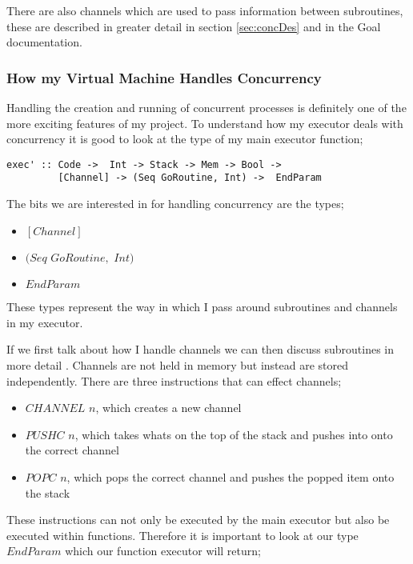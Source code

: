 There are also channels which are used to pass information between subroutines, these are described in greater detail in section \ref{sec:concDes} and in the Goal documentation.   

\subsubsection{How my Virtual Machine Handles Concurrency}

Handling the creation and running of concurrent processes is definitely one of the more exciting features of my project. To understand how my executor deals with concurrency it is good to look at the type of my main executor function;

\begin{lstlisting}
exec' :: Code ->  Int -> Stack -> Mem -> Bool -> 
         [Channel] -> (Seq GoRoutine, Int) ->  EndParam
\end{lstlisting}

The bits we are interested in for handling concurrency are the types;

\begin{itemize}
\item $[Channel]$
\item $(Seq$ $GoRoutine,$ $Int)$  %
\item $EndParam$
\end{itemize} 

These types represent the way in which I pass around subroutines and channels in my executor. 

If we first talk about how I handle channels we can then discuss subroutines in more detail . Channels are not held in memory but instead are stored independently. There are three instructions that can effect channels;

\begin{itemize}
\item $CHANNEL$ $n$, which creates a new channel
\item $PUSHC$ $n$, which takes whats on the top of the stack and pushes into onto the correct channel 
\item $POPC$ $n$, which pops the correct channel and pushes the popped item onto the stack
\end{itemize} 

These instructions can not only be executed by the main executor but also be executed within functions. Therefore it is important to look at our type $EndParam$ which our function executor will return;

